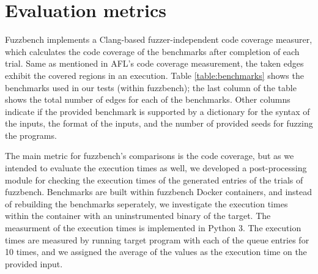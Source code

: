 \section{Evaluation metrics}
\label{sec:ch4-metrics}


Fuzzbench implements a Clang-based fuzzer-independent code coverage measurer, which calculates the code coverage of the benchmarks after completion of each trial. Same as mentioned in AFL's code coverage measurement, the taken edges exhibit the covered regions in an execution. Table \ref{table:benchmarks} shows the benchmarks used in our tests (within fuzzbench); the last column of the table shows the total number of edges for each of the benchmarks. Other columns indicate if the provided benchmark is supported by a dictionary for the syntax of the inputs, the format of the inputs, and the number of provided seeds for fuzzing the programs. 

\begin{table}[]
    \centering
    \caption{List of benchmarks used in evaluation}
    \label{table:benchmarks}
\end{table}


The main metric for fuzzbench's comparisons is the code coverage, but as we intended to evaluate the execution times as well, we developed a post-processing module for checking the execution times of the generated entries of the trials of fuzzbench. Benchmarks are built within fuzzbench Docker containers, and instead of rebuilding the benchmarks seperately, we investigate the execution times within the container with an uninstrumented binary of the target. The measurment of the execution times is implemented in Python 3. The execution times are measured by running target program with each of the queue entries for 10 times, and we assigned the average of the values as the execution time on the provided input.
